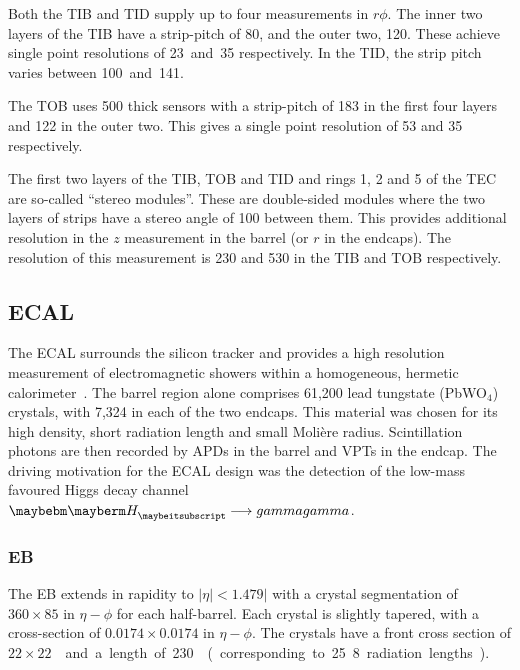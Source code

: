 Both the \ac{TIB} and \ac{TID} supply up to four measurements in $r\phi$. The
inner two layers of the \ac{TIB} have a strip-pitch of \unit{80}{\micro\metre},
and the outer two, \unit{120}{\micro\metre}. These achieve single point
resolutions of \unit{23 and 35}{\micro\metre} respectively. In the \ac{TID}, the
strip pitch varies between \unit{100 and 141}{\micro\metre}.

The \ac{TOB} uses \unit{500}{\micro\metre} thick sensors with a strip-pitch of
\unit{183}{\micro\metre} in the first four layers and \unit{122}{\micro\metre} in
the outer two. This gives a single point resolution of \unit{53}{\micro\metre}
and \unit{35}{\micro\metre} respectively.

The first two layers of the \ac{TIB}, \ac{TOB} and \ac{TID} and rings 1, 2 and 5
of the \ac{TEC} are so-called ``stereo modules''. These are double-sided modules
where the two layers of strips have a stereo angle of \unit{100}{\milli\radian}
between them. This provides additional resolution in the $z$ measurement in the
barrel (or $r$ in the endcaps). The resolution of this measurement is
\unit{230}{\micro\metre} and \unit{530}{\micro\metre} in the \ac{TIB} and
\ac{TOB} respectively.

\subsection{\acl{ECAL}}
The \ac{ECAL} surrounds the silicon tracker and provides a high resolution
measurement of electromagnetic showers within a homogeneous, hermetic
calorimeter~\cite{ecal_paper}. The barrel region alone comprises 61,200 lead
tungstate (PbWO$_4$) crystals, with 7,324 in each of the two endcaps. This
material was chosen for its high density, short radiation length and small
Moli\`{e}re radius. Scintillation photons are then recorded by \acp{APD} in the
barrel and \acp{VPT} in the endcap. The driving motivation for the \ac{ECAL}
design was the detection of the low-mass favoured Higgs decay channel
$\PH\longrightarrow\gamma\gamma$.

\subsubsection{\acl{EB}}
The \ac{EB} extends in rapidity to $|\eta|<1.479|$ with a crystal segmentation
of $360\times 85$ in $\eta-\phi$ for each half-barrel. Each crystal is slightly
tapered, with a cross-section of $0.0174\times0.0174$ in $\eta-\phi$. The
crystals have a front cross section of \unit{$22\times
  22$}{\milli\metre\squared} and a length of \unit{230}{\milli\metre}
(corresponding to 25.8 radiation lengths).

